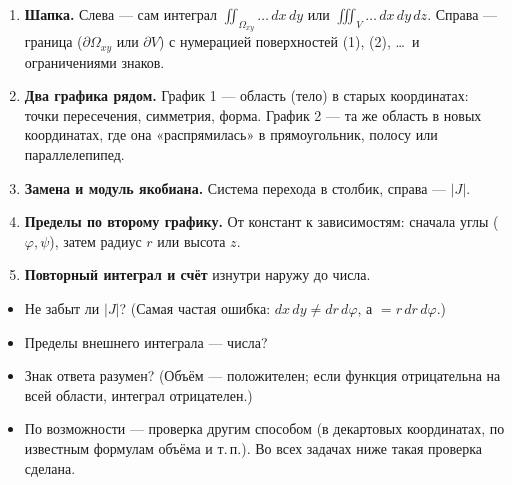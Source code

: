 \begin{enumerate}[label=\textbf{Шаг \arabic*.},leftmargin=4em]
\item \textbf{Шапка.} Слева --- сам интеграл $\iint_{\Omega_{xy}}\dots\,dx\,dy$ или $\iiint_V\dots\,dx\,dy\,dz$. Справа --- граница ($\partial\Omega_{xy}$ или $\partial V$) с нумерацией поверхностей (1), (2), \dots\ и ограничениями знаков.
\item \textbf{Два графика рядом.} График 1 --- область (тело) в старых координатах: точки пересечения, симметрия, форма. График 2 --- та же область в новых координатах, где она «распрямилась» в прямоугольник, полосу или параллелепипед.
\item \textbf{Замена и модуль якобиана.} Система перехода в столбик, справа --- $|J|$.
\item \textbf{Пределы по второму графику.} От констант к зависимостям: сначала углы ($\varphi,\psi$), затем радиус $r$ или высота $z$.
\item \textbf{Повторный интеграл и счёт} изнутри наружу до числа.
\end{enumerate}

\begin{notebox}
\begin{itemize}
\item Не забыт ли $|J|$? (Самая частая ошибка: $dx\,dy\ne dr\,d\varphi$, а $=r\,dr\,d\varphi$.)
\item Пределы внешнего интеграла --- числа?
\item Знак ответа разумен? (Объём --- положителен; если функция отрицательна на всей области, интеграл отрицателен.)
\item По возможности --- проверка другим способом (в декартовых координатах, по известным формулам объёма и т.\,п.). Во всех задачах ниже такая проверка сделана.
\end{itemize}
\end{notebox}

